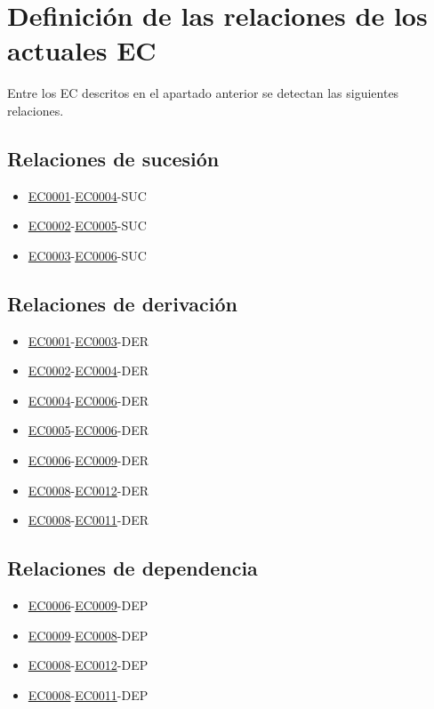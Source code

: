 \section{Definición de las relaciones de los actuales EC}
\par Entre los EC descritos en el apartado anterior se detectan las siguientes relaciones.
\subsection{Relaciones de sucesión}
\begin{itemize}[-]
  \item \hyperref[EC:0001]{EC0001}-\hyperref[EC:0004]{EC0004}-SUC
  \item \hyperref[EC:0002]{EC0002}-\hyperref[EC:0005]{EC0005}-SUC
  \item \hyperref[EC:0003]{EC0003}-\hyperref[EC:0006]{EC0006}-SUC
\end{itemize}

\subsection{Relaciones de derivación}
\begin{itemize}[-]
  \item \hyperref[EC:0001]{EC0001}-\hyperref[EC:0003]{EC0003}-DER
  \item \hyperref[EC:0002]{EC0002}-\hyperref[EC:0004]{EC0004}-DER
  \item \hyperref[EC:0004]{EC0004}-\hyperref[EC:0006]{EC0006}-DER
  \item \hyperref[EC:0005]{EC0005}-\hyperref[EC:0006]{EC0006}-DER
  \item \hyperref[EC:0006]{EC0006}-\hyperref[EC:0009]{EC0009}-DER
  \item \hyperref[EC:0008]{EC0008}-\hyperref[EC:0011]{EC0012}-DER
  \item \hyperref[EC:0008]{EC0008}-\hyperref[EC:0011]{EC0011}-DER
\end{itemize}

\subsection{Relaciones de dependencia}
\begin{itemize}[-]
  \item \hyperref[EC:0006]{EC0006}-\hyperref[EC:0009]{EC0009}-DEP
  \item \hyperref[EC:0009]{EC0009}-\hyperref[EC:0008]{EC0008}-DEP
  \item \hyperref[EC:0008]{EC0008}-\hyperref[EC:0012]{EC0012}-DEP
  \item \hyperref[EC:0008]{EC0008}-\hyperref[EC:0011]{EC0011}-DEP
\end{itemize}

